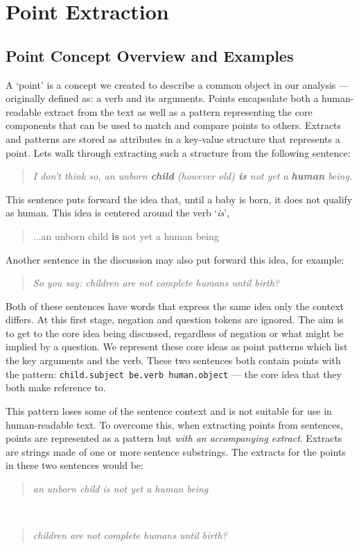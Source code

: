 \chapter{Point Extraction\label{chap:point-extraction}}
  \section{Point Concept Overview and Examples}
    A `point' is a concept we created to describe a common object in our analysis --- originally defined as: a verb and its arguments. Points encapsulate both a human-readable extract from the text as well as a pattern representing the core components that can be used to match and compare points to others. Extracts and patterns are stored as attributes in a key-value structure that represents a point. Lets walk through extracting such a structure from the following sentence:

    \smallskip
    \begin{center}
      \blockquote{\textit{I don't think so, an unborn \textbf{child} (however old) \textbf{is} not yet a \textbf{human} being.}}
    \end{center}
    \smallskip

    This sentence puts forward the idea that, until a baby is born, it does not qualify as human. This idea is centered around the verb `\textit{is}', \blockquote{...an unborn child \textbf{is} not yet a human being}. Another sentence in the discussion may also put forward this idea, for example: \blockquote{\textit{So you say: children are not complete humans until birth?}}. Both of these sentences have words that express the same idea only the context differs. At this first stage, negation and question tokens are ignored. The aim is to get to the core idea being discussed, regardless of negation or what might be implied by a question. We represent these core ideas as point patterns which list the key arguments and the verb. These two sentences both contain points with the pattern: \texttt{child.subject be.verb human.object} --- the core idea that they both make reference to.

    This pattern loses some of the sentence context and is not suitable for use in human-readable text. To overcome this, when extracting points from sentences, points are represented as a pattern but \textit{with an accompanying extract}. Extracts are strings made of one or more sentence substrings. The extracts for the points in these two sentences would be:

    \smallskip
    \begin{center}
      \blockquote{\textit{an unborn child is not yet a human being}} \\ \blockquote{\textit{children are not complete humans until birth?}}
    \end{center}
    \smallskip

